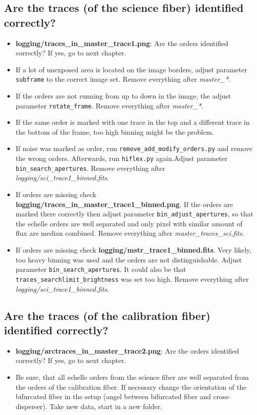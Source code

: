 \documentclass[10pt,a4paper]{article}
\begin{document}
\subsection{Are the traces (of the science fiber) identified correctly?}
\begin{itemize}
  \item \textbf{logging/traces\_in\_master\_trace1.png}: Are the orders identified correctly? If yes, go to next chapter.
  \item If a lot of unexposed area is located on the image borders, adjust parameter \verb|subframe| to the correct image set. Remove everything after \textit{master\_*}.
  \item If the orders are not running from up to down in the image, the adjust parameter \verb|rotate_frame|.  Remove everything after \textit{master\_*}.
  \item If the same order is marked with one trace in the top and a different trace in the bottom of the frame, too high binning might be the problem. 
  \item If noise was marked as order, run \verb|remove_add_modify_orders.py| and remove the wrong orders. Afterwards, run \verb|hiflex.py| again.Adjust parameter \verb|bin_search_apertures|. Remove everything after \textit{logging/sci\_trace1\_binned.fits}.
  \item If orders are missing check \textbf{logging/traces\_in\_master\_trace1\_binned.png}. If the orders are marked there correctly then adjust parameter \verb|bin_adjust_apertures|, so that the echelle orders are well separated and only pixel with similar amount of flux are median combined. Remove everything after \textit{master\_traces\_sci.fits}.
  \item If orders are missing check \textbf{logging/mstr\_trace1\_binned.fits}. Very likely, too heavy binning was used and the orders are not distinguishable. Adjust parameter \verb|bin_search_apertures|. It could also be that \verb|traces_searchlimit_brightness| was set too high. Remove everything after \textit{logging/sci\_trace1\_binned.fits}.
\end{itemize}


\subsection{Are the traces (of the calibration fiber) identified correctly?}
\begin{itemize}
  \item \textbf{logging/arctraces\_in\_master\_trace2.png}: Are the orders identified correctly? If yes, go to next chapter.
  \item Be sure, that all echelle orders from the science fiber are well separated from the orders of the calibration fiber. If necessary change the orientation of the bifurcated fiber in the setup (angel between bifurcated fiber and cross-disperser). Take new data, start in a new folder.
\end{itemize}
\end{document}
